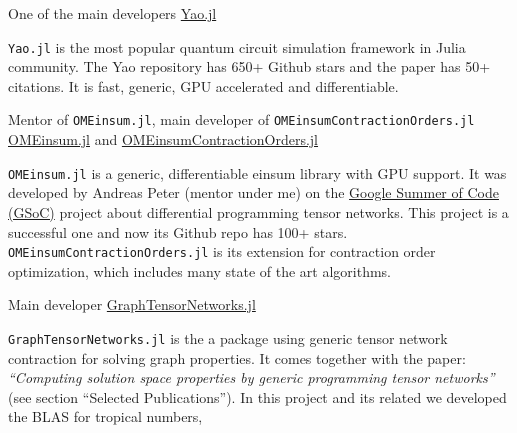 \documentclass[11pt, a4paper]{awesome-cv}
\begin{document}
\begin{cventries}
  \cventry
    {One of the main developers} %
    {\href{https://github.com/QuantumBFS/Yao.jl}{Yao.jl}} %
    {} %
    {} %
    {
      \begin{cvitems} %
          {\texttt{Yao.jl} is the most popular quantum circuit simulation framework in Julia community.
          The Yao repository has 650+ Github stars and the paper has 50+ citations.
          It is fast, generic, GPU accelerated and differentiable.
          }
      \end{cvitems}
    }
  \cventry
    {Mentor of \texttt{OMEinsum.jl}, main developer of \texttt{OMEinsumContractionOrders.jl}} %
    {\href{https://github.com/under-Peter/OMEinsum.jl}{OMEinsum.jl} and \href{OMEinsumContractionOrders.jl}{OMEinsumContractionOrders.jl}} %
    {}{}
    {
      \begin{cvitems} %
          {\texttt{OMEinsum.jl} is a generic, differentiable einsum library with GPU support. It was developed by Andreas Peter (mentor under me) on the \href{https://summerofcode.withgoogle.com/}{Google Summer of Code (GSoC)} project about differential programming tensor networks. This project is a successful one and now its Github repo has 100+ stars.
          \texttt{OMEinsumContractionOrders.jl} is its extension for contraction order optimization, which includes many state of the art algorithms.}
      \end{cvitems}
    }

  \cventry
    {Main developer}
    {\href{https://github.com/Happy-Diode/GraphTensorNetworks.jl}{GraphTensorNetworks.jl}} %
    {}{}
    {
      \begin{cvitems} %
          {\texttt{GraphTensorNetworks.jl} is the a package using generic tensor network contraction for solving graph properties. It comes together with the paper: \textit{``Computing solution space properties by generic programming tensor networks''} (see section ``Selected Publications''). In this project and its related we developed the BLAS for tropical numbers,}
      \end{cvitems}
    }

\end{cventries}
\end{document}
